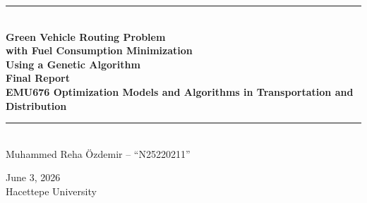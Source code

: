 \documentclass [a4paper, 11pt, titlepage] {article}
\date{June 3, 2026}
\begin{document}
\setlength{\parindent}{4mm}
\renewcommand{\algorithmiccomment}[1]{//#1}

\begin{titlepage}
  \begin{center}
    \noindent\rule{\linewidth}{1mm}\\[4mm]
    {\sffamily\bfseries \Huge Green Vehicle Routing Problem}\\[2mm]
    {\sffamily\bfseries \Large with Fuel Consumption Minimization}\\[1mm]
    {\sffamily\bfseries \Large Using a Genetic Algorithm} \\[4mm]
    {\sffamily\bfseries \Large Final Report}\\[0mm]
    {\sffamily\bfseries \Large EMU676 Optimization Models and Algorithms in Transportation and Distribution}\\[0mm]
    \noindent\rule{\linewidth}{1mm}\\[30mm]
    \large Muhammed Reha \"{O}zdemir -- ``N25220211'' \\


    \large June 3, 2026 \\[6mm]
    Hacettepe University
  \end{center}
\end{titlepage}

\newpage
{}
\tableofcontents
\newpage
{}

\begin{abstract}
This report presents the complete work on a project about the Green Vehicle Routing Problem (GVRP), a variant of the classical Capacitated Vehicle Routing Problem (CVRP) where the objective is to minimize fuel consumption instead of total distance. The key idea, taken from Xiao et al.\ \cite{xiao2012}, is that the fuel consumption rate of a vehicle depends linearly on its current load, so the sequence in which customers are visited has a direct effect on total fuel used. A Mixed Integer Linear Programming (MILP) formulation is given based on the model of Xiao et al.\ \cite{xiao2012}, covering sets, parameters, decision variables, objective function and constraints. A Genetic Algorithm (GA) with permutation-based encoding, Order Crossover, swap and inversion mutation, tournament selection and elitism is implemented in Python and tested on ten GVRP instances of varying sizes (from $10$ to $150$ customers). Each instance is solved five times with different random seeds, and the GA is also compared against a deterministic nearest-neighbor greedy baseline. The GA finds the exact optimum on the smallest instance (verified by full enumeration of $10!$ permutations) and beats the greedy baseline on the small and medium instances, but underperforms it on the largest instances. This is consistent with the well-known observation that a pure GA without local search tends to lose against simple route-construction heuristics on large VRPs.
\end{abstract}
\end{document}
